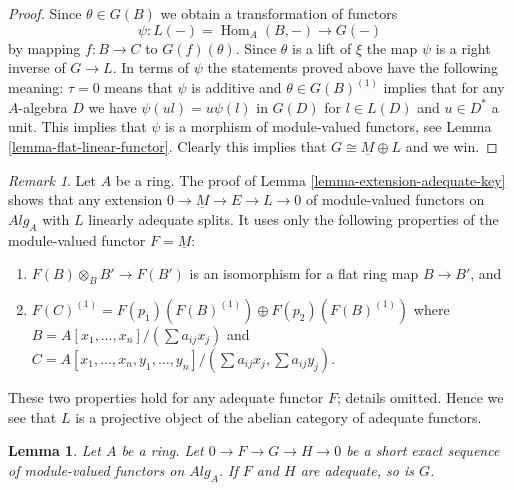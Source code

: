 \documentclass{stacks-project}
\theoremstyle{plain}
\newtheorem{lemma}[subsection]{Lemma}
\theoremstyle{definition}
\theoremstyle{remark}
\newtheorem{remark}[subsection]{Remark}
\numberwithin{equation}{subsection}
\def\Hom{\mathop{\mathrm{Hom}}\nolimits}
\begin{document}
\begin{proof}
\medskip\noindent
Since $\theta \in G(B)$ we obtain a transformation of functors
$$
\psi : L(-) = \Hom_A(B, - ) \longrightarrow G(-)
$$
by mapping $f : B \to C$ to $G(f)(\theta)$. Since $\theta$ is a lift of
$\xi$ the map $\psi$ is a right inverse of $G \to L$. In terms of
$\psi$ the statements proved above have the following meaning:
$\tau = 0$ means that $\psi$ is additive and
$\theta \in G(B)^{(1)}$ implies that for any $A$-algebra $D$ we have
$\psi(ul) = u\psi(l)$ in $G(D)$ for $l \in L(D)$ and $u \in D^*$ a unit.
This implies that $\psi$ is a morphism of module-valued functors, see
Lemma \ref{lemma-flat-linear-functor}.
Clearly this implies that $G \cong \underline{M} \oplus L$ and we win.
\end{proof}

\begin{remark}
\label{remark-linearly-adequate}
Let $A$ be a ring.
The proof of
Lemma \ref{lemma-extension-adequate-key}
shows that any extension $0 \to \underline{M} \to E \to L \to 0$
of module-valued functors on $\textit{Alg}_A$
with $L$ linearly adequate splits. It uses only the following properties
of the module-valued functor $F = \underline{M}$:
\begin{enumerate}
\item $F(B) \otimes_B B' \to F(B')$ is an isomorphism
for a flat ring map $B \to B'$, and
\item
$F(C)^{(1)} = F(p_1)(F(B)^{(1)}) \oplus F(p_2)(F(B)^{(1)})$
where $B = A[x_1, \ldots, x_n]/(\sum a_{ij}x_j)$ and
$C = A[x_1, \ldots, x_n, y_1, \ldots, y_n]/
(\sum a_{ij}x_j, \sum a_{ij}y_j)$.
\end{enumerate}
These two properties hold for any adequate functor $F$; details omitted.
Hence we see that $L$ is a projective object of the abelian category of
adequate functors.
\end{remark}

\begin{lemma}
\label{lemma-extension-adequate}
Let $A$ be a ring.
Let $0 \to F \to G \to H \to 0$ be a short exact sequence of
module-valued functors on $\textit{Alg}_A$.
If $F$ and $H$ are adequate, so is $G$.
\end{lemma}
\end{document}
